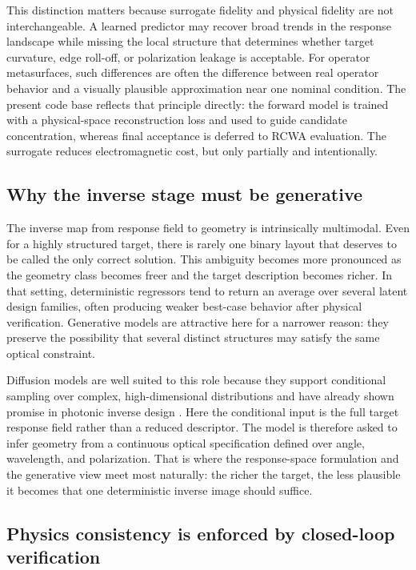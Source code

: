 This distinction matters because surrogate fidelity and physical fidelity are not interchangeable. A learned predictor may recover broad trends in the response landscape while missing the local structure that determines whether target curvature, edge roll-off, or polarization leakage is acceptable. For operator metasurfaces, such differences are often the difference between real operator behavior and a visually plausible approximation near one nominal condition. The present code base reflects that principle directly: the forward model is trained with a physical-space reconstruction loss and used to guide candidate concentration, whereas final acceptance is deferred to RCWA evaluation. The surrogate reduces electromagnetic cost, but only partially and intentionally.

\subsection{Why the inverse stage must be generative}

The inverse map from response field to geometry is intrinsically multimodal. Even for a highly structured target, there is rarely one binary layout that deserves to be called the only correct solution. This ambiguity becomes more pronounced as the geometry class becomes freer and the target description becomes richer. In that setting, deterministic regressors tend to return an average over several latent design families, often producing weaker best-case behavior after physical verification. Generative models are attractive here for a narrower reason: they preserve the possibility that several distinct structures may satisfy the same optical constraint.

Diffusion models are well suited to this role because they support conditional sampling over complex, high-dimensional distributions and have already shown promise in photonic inverse design \cite{liu2018,so2019,ma2021,tanriover2023,zhang2023,zhang2024,hen2026}. Here the conditional input is the full target response field rather than a reduced descriptor. The model is therefore asked to infer geometry from a continuous optical specification defined over angle, wavelength, and polarization. That is where the response-space formulation and the generative view meet most naturally: the richer the target, the less plausible it becomes that one deterministic inverse image should suffice.

\subsection{Physics consistency is enforced by closed-loop verification}


